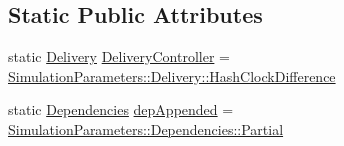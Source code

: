 \subsection*{Static Public Attributes}
\begin{DoxyCompactItemize}
\item 
static \hyperlink{classSimulationParameters_ae08444273809241f502aa422205f7307}{Delivery} \hyperlink{classSimulationParameters_ab379e91439dd9d4179096d30f930d459}{Delivery\+Controller} = \hyperlink{classSimulationParameters_ae08444273809241f502aa422205f7307a9a46ad9fb926b8b78ba9395f96aa6af0}{Simulation\+Parameters\+::\+Delivery\+::\+Hash\+Clock\+Difference}
\item 
static \hyperlink{classSimulationParameters_afb3b6aaecd4b19ef1991c870c8402dff}{Dependencies} \hyperlink{classSimulationParameters_ad0c30ae3194fb07ca8a456331fce1add}{dep\+Appended} = \hyperlink{classSimulationParameters_afb3b6aaecd4b19ef1991c870c8402dffa44ffd38a6dea695cbe2b34efdcc6cf27}{Simulation\+Parameters\+::\+Dependencies\+::\+Partial}
\end{DoxyCompactItemize}
